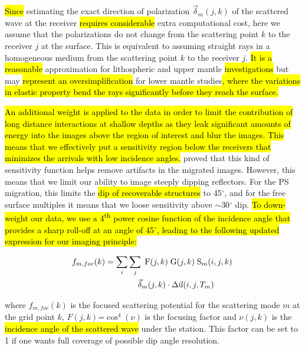 \documentclass[10pt,a4paper]{article}
\begin{document}
\hl{Since} estimating the exact direction of polarization $\vec{\delta}_m(j,k)$ of the scattered wave at the receiver \hl{requires considerable} extra computational cost, here we assume that the polarizations do not change from the scattering point $k$ to the receiver $j$ at the surface.
This is equivalent to assuming straight rays in a homogeneous medium from the scattering point $k$ to the receiver $j$.
\hl{It is a reasonable} approximation for lithospheric and upper mantle \hl{investigations} but may \hl{represent an oversimplification} for lower mantle studies\hl{, where the variations in elastic property bend the rays significantly before they reach the surface.}

\hl{An additional weight is applied to the data in order to limit the contribution of long distance interactions at shallow depths as they leak significant amounts of energy into the images above the region of interest and blur the images.
This means that we effectively put a sensitivity region below the receivers that minimizes the arrivals with low incidence angles.}
\citet{cheng_gji_16} proved that this kind of sensitivity function helps remove artifacts in the migrated images.
However, this means that we limit our ability to image steeply dipping reflectors.
For the PS migration, this limits the \hl{dip of recoverable structures} to 45$^{\circ}$, and for the free surface multiples it means that we loose sensitivity above $\sim$30$^{\circ}$ dip.
\hl{To down-weight our data, we use a 4\textsuperscript{th} power cosine function of the incidence angle that provides a sharp roll-off at an angle of 45$^{\circ}$, leading to the following updated expression for our imaging principle:}

\begin{align}
  f_{m,foc}(k) &= \sum_i \sum_j \; \text{F}(j,k) \; \text{G}(j,k) \; \text{S}_{m}(i,j,k) \; \notag\\&\qquad\qquad \vec{\delta}_{m}(j,k) \cdot \Delta\vec{\text{u}}(i,j,T_m)
  \label{foc}
\end{align}
\vspace{1mm}

\noindent where $f_{m,foc}(k)$ is the focused scattering potential for the scattering mode $m$ at the grid point $k$, $F(j,k)$=$\cos^4(\nu)$ is the focusing factor and $\nu(j,k)$ is the \hl{incidence angle of the scattered wave} under the station.
This factor can be set to 1 if one wants full coverage of possible dip angle resolution.
\end{document}
